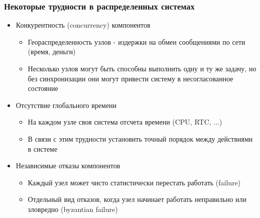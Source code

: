 \documentclass{beamer}
\begin{document}
\begin{frame}
  \frametitle{Некоторые трудности в распределенных системах}

  \begin{itemize}
    \item Конкурентность (concurrency) компонентов
      \begin{itemize}
        \item Геораспределенность узлов - издержки на обмен сообщениями по сети (время, деньги)
        \item Несколько узлов могут быть способны выполнить одну и ту же задачу, но без синхронизации они могут привести систему в несогласованное состояние
      \end{itemize}
    \item Отсутствие глобального времени
      \begin{itemize}
        \item На каждом узле своя система отсчета времени (CPU, RTC, ...)
        \item В связи с этим трудности установить точный порядок между действиями в системе
      \end{itemize}
    \item Независимые отказы компонентов
    \begin{itemize}
      \item Каждый узел может чисто статистически перестать работать (failure)
      \item Отдельный вид отказов, когда узел начинает работать неправильно или зловредно (byzantian failure)
    \end{itemize}
  \end{itemize}
\end{frame}
\end{document}
